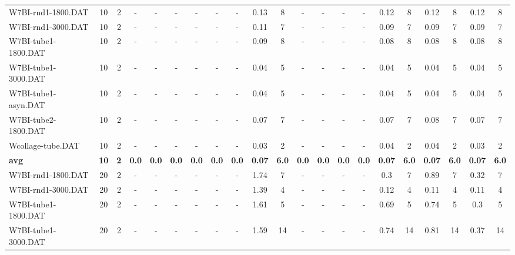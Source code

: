 \begin{sidewaystable}[!ht]
{\begin{tabular}{lcccccccccccccccccccc}
W7BI-rnd1-1800.DAT & 10 & 2 &  - &  - &  - &  - &  - &  - & 0.13 & 8 &  - &  - &  - &  - &  \textcolor{blue2}{0.12} & 8 &  \textcolor{blue2}{0.12} & 8 &  \textcolor{blue2}{0.12} & 8 \\
W7BI-rnd1-3000.DAT & 10 & 2 &  - &  - &  - &  - &  - &  - & 0.11 & 7 &  - &  - &  - &  - &  \textcolor{blue2}{0.09} & 7 &  \textcolor{blue2}{0.09} & 7 &  \textcolor{blue2}{0.09} & 7 \\
W7BI-tube1-1800.DAT & 10 & 2 &  - &  - &  - &  - &  - &  - & 0.09 & 8 &  - &  - &  - &  - &  \textcolor{blue2}{0.08} & 8 &  \textcolor{blue2}{0.08} & 8 &  \textcolor{blue2}{0.08} & 8 \\
W7BI-tube1-3000.DAT & 10 & 2 &  - &  - &  - &  - &  - &  - &  \textcolor{blue2}{0.04} & 5 &  - &  - &  - &  - &  \textcolor{blue2}{0.04} & 5 &  \textcolor{blue2}{0.04} & 5 &  \textcolor{blue2}{0.04} & 5 \\
W7BI-tube1-asyn.DAT & 10 & 2 &  - &  - &  - &  - &  - &  - &  \textcolor{blue2}{0.04} & 5 &  - &  - &  - &  - &  \textcolor{blue2}{0.04} & 5 &  \textcolor{blue2}{0.04} & 5 &  \textcolor{blue2}{0.04} & 5 \\
W7BI-tube2-1800.DAT & 10 & 2 &  - &  - &  - &  - &  - &  - &  \textcolor{blue2}{0.07} & 7 &  - &  - &  - &  - &  \textcolor{blue2}{0.07} & 7 & 0.08 & 7 &  \textcolor{blue2}{0.07} & 7 \\
Wcollage-tube.DAT & 10 & 2 &  - &  - &  - &  - &  - &  - &  \textcolor{blue2}{0.03} & 2 &  - &  - &  - &  - & 0.04 & 2 & 0.04 & 2 &  \textcolor{blue2}{0.03} & 2 \\
\cline{1-21} \textbf{avg} & \textbf{10} & \textbf{2} & \textbf{0.0} & \textbf{0.0} & \textbf{0.0} & \textbf{0.0} & \textbf{0.0} & \textbf{0.0} & \textbf{0.07} & \textbf{6.0} & \textbf{0.0} & \textbf{0.0} & \textbf{0.0} & \textbf{0.0} & \textbf{0.07} & \textbf{6.0} & \textbf{0.07} & \textbf{6.0} & \textbf{0.07} & \textbf{6.0} \\ \cline{1-21}
W7BI-rnd1-1800.DAT & 20 & 2 &  - &  - &  - &  - &  - &  - & 1.74 & 7 &  - &  - &  - &  - &  \textcolor{blue2}{0.3} & 7 & 0.89 & 7 & 0.32 & 7 \\
W7BI-rnd1-3000.DAT & 20 & 2 &  - &  - &  - &  - &  - &  - & 1.39 & 4 &  - &  - &  - &  - & 0.12 & 4 &  \textcolor{blue2}{0.11} & 4 &  \textcolor{blue2}{0.11} & 4 \\
W7BI-tube1-1800.DAT & 20 & 2 &  - &  - &  - &  - &  - &  - & 1.61 & 5 &  - &  - &  - &  - & 0.69 & 5 & 0.74 & 5 &  \textcolor{blue2}{0.3} & 5 \\
W7BI-tube1-3000.DAT & 20 & 2 &  - &  - &  - &  - &  - &  - & 1.59 & 14 &  - &  - &  - &  - & 0.74 & 14 & 0.81 & 14 &  \textcolor{blue2}{0.37} & 14 \\

\end{tabular}}
\end{sidewaystable}
